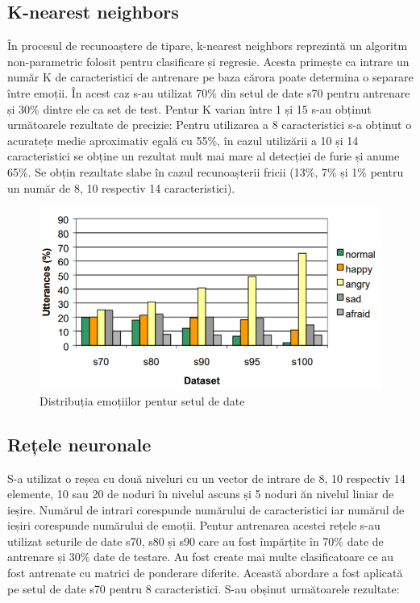 \documentclass[9pt,shortpaper,twoside,web]{ieeecolor}
\begin{document}
\subsection{K-nearest neighbors}
În procesul de recunoaștere de tipare, k-nearest neighbors reprezintă un algoritm non-parametric folosit pentru clasificare și regresie. Acesta primește ca intrare un număr K de caracteristici de antrenare pe baza cărora poate determina o separare între emoții.
În acest caz s-au utilizat 70\% din setul de date s70 pentru antrenare și 30\% dintre ele ca set de test. Pentur K varian între 1 și 15 s-au obținut următoarele rezultate de precizie: Pentru utilizarea a 8 caracteristici s-a obținut o acuratețe medie aproximativ egală cu 55\%, în cazul utilizării a 10 și 14 caracteristici se obține un rezultat mult mai mare al detecției de furie și anume 65\%. Se obțin rezultate slabe în cazul recunoașterii fricii (13\%, 7\% și 1\% pentru un număr de 8, 10 respectiv 14 caracteristici).

\begin{figure}[htb]
\includegraphics[width=\columnwidth]{res/fig/data-set}
\caption{Distribuția emoțiilor pentur setul de date \cite{b9}}
\label{fig7}
\end{figure}


\subsection{Rețele neuronale}
S-a utilizat o reșea cu două niveluri cu un vector de intrare de 8, 10 respectiv 14 elemente, 10 sau 20 de noduri în nivelul ascuns și 5 noduri ăn nivelul liniar de ieșire. Numărul de intrari corespunde numărului de caracteristici iar numărul de ieșiri corespunde numărului de emoții. Pentur antrenarea acestei rețele s-au utilizat seturile de date s70, s80 și s90 care au fost împărțite în 70\% date de antrenare și 30\% date de testare. Au fost create mai multe clasificatoare ce au fost antrenate cu matrici de ponderare diferite. Această abordare a fost aplicată pe setul de date s70 pentru 8 caracteristici. S-au obșinut următoarele rezultate: 
\end{document}
